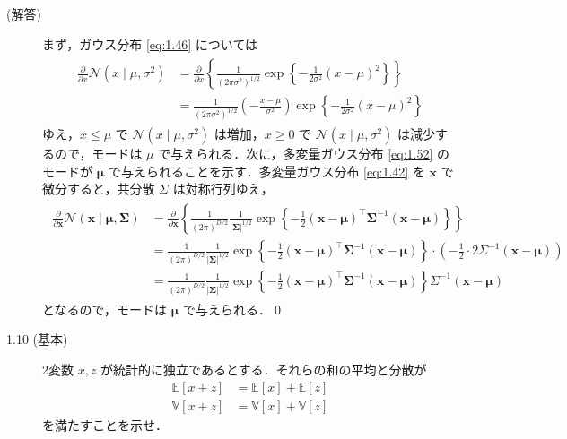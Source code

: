 \documentclass[uplatex,a4paper,oneside,openany,dvipdfmx]{jsarticle}
\numberwithin{equation}{section}
\theoremstyle{mystyle} %
\newcommand{\BE}{\mathbb{E}}
\newcommand{\BV}{\mathbb{V}}
\newcommand{\CN}{\mathcal{N}}
\newcommand{\bs}[1]{\boldsymbol{#1}}
\begin{document}
\begin{description}
\item[(解答)] まず，ガウス分布 \eqref{eq:1.46} については
\begin{align}
    \begin{aligned}
        \frac{\partial}{\partial x} \CN(x \mid \mu,\sigma^{2}) &= \frac{\partial}{\partial x} \left\{\frac{1}{(2\pi\sigma^{2})^{1/2}} \exp{\left\{-\frac{1}{2\sigma^{2}}(x-\mu)^{2}\right\}}\right\} \\
        &= \frac{1}{(2\pi\sigma^{2})^{1/2}} \left(-\frac{x-\mu}{\sigma^{2}}\right)\exp{\left\{-\frac{1}{2\sigma^{2}}(x-\mu)^{2}\right\}}
    \end{aligned}
\end{align}
ゆえ，$x \le \mu$ で $\CN(x \mid \mu,\sigma^{2})$ は増加，$x \ge 0$ で $\CN(x \mid \mu,\sigma^{2})$ は減少するので，モードは $\mu$ で与えられる．次に，多変量ガウス分布 \eqref{eq:1.52} のモードが $\bs{\mu}$ で与えられることを示す．多変量ガウス分布 \eqref{eq:1.42} を $\bs{x}$ で微分すると，共分散 $\Sigma$ は対称行列ゆえ，
\begin{align}
    \begin{aligned}
        \frac{\partial}{\partial{\bs{x}}} \CN(\bs{x} \mid \bs{\mu}, \bs{\Sigma}) &= \frac{\partial}{\partial{\bs{x}}} \left\{\frac{1}{(2\pi)^{D/2}} \frac{1}{|\bs{\Sigma}|^{1/2}} \exp{\left\{-\frac{1}{2}(\bs{x}-\bs{\mu})^{\top}\bs{\Sigma}^{-1}(\bs{x}-\bs{\mu})\right\}}\right\} \\
        &= \frac{1}{(2\pi)^{D/2}} \frac{1}{|\bs{\Sigma}|^{1/2}} \exp{\left\{-\frac{1}{2}(\bs{x}-\bs{\mu})^{\top}\bs{\Sigma}^{-1}(\bs{x}-\bs{\mu})\right\}} \cdot \left(-\frac{1}{2} \cdot 2 \Sigma^{-1} (\bs{x}-\bs{\mu})\right) \\
        &= \frac{1}{(2\pi)^{D/2}} \frac{1}{|\bs{\Sigma}|^{1/2}} \exp{\left\{-\frac{1}{2}(\bs{x}-\bs{\mu})^{\top}\bs{\Sigma}^{-1}(\bs{x}-\bs{\mu})\right\}} \Sigma^{-1} (\bs{x}-\bs{\mu})
    \end{aligned}
\end{align}
となるので，モードは $\bs{\mu}$ で与えられる．\qed

\item[1.10 (基本)]  2変数 $x,z$ が統計的に独立であるとする．それらの和の平均と分散が
\begin{align}
    \BE[x+z] &= \BE[x] + \BE[z] \label{eq:1.128}\\
    \BV[x+z] &= \BV[x] + \BV[z] \label{eq:1.129}
\end{align}
を満たすことを示せ．


\end{description}
\end{document}
